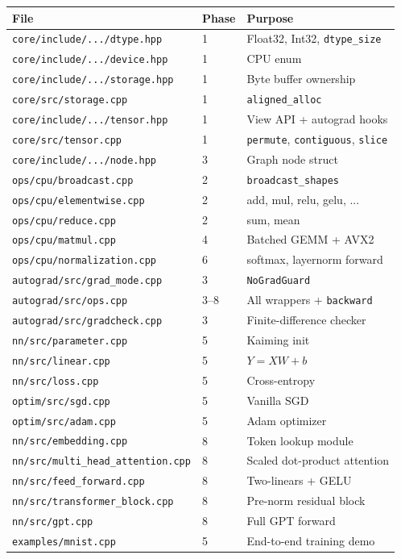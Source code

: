 \documentclass[11pt,a4paper]{article}
\begin{document}
\begin{center}
\scriptsize
\begin{longtable}{@{}p{4.5cm}p{2cm}p{7cm}@{}}
  \toprule
  File & Phase & Purpose \\
  \midrule
  \endhead
  \texttt{core/include/.../dtype.hpp} & 1 & Float32, Int32, \texttt{dtype\_size} \\
  \texttt{core/include/.../device.hpp} & 1 & CPU enum \\
  \texttt{core/include/.../storage.hpp} & 1 & Byte buffer ownership \\
  \texttt{core/src/storage.cpp} & 1 & \texttt{aligned\_alloc} \\
  \texttt{core/include/.../tensor.hpp} & 1 & View API + autograd hooks \\
  \texttt{core/src/tensor.cpp} & 1 & \texttt{permute}, \texttt{contiguous}, \texttt{slice} \\
  \texttt{core/include/.../node.hpp} & 3 & Graph node struct \\
  \texttt{ops/cpu/broadcast.cpp} & 2 & \texttt{broadcast\_shapes} \\
  \texttt{ops/cpu/elementwise.cpp} & 2 & add, mul, relu, gelu, ... \\
  \texttt{ops/cpu/reduce.cpp} & 2 & sum, mean \\
  \texttt{ops/cpu/matmul.cpp} & 4 & Batched GEMM + AVX2 \\
  \texttt{ops/cpu/normalization.cpp} & 6 & softmax, layernorm forward \\
  \texttt{autograd/src/grad\_mode.cpp} & 3 & \texttt{NoGradGuard} \\
  \texttt{autograd/src/ops.cpp} & 3--8 & All wrappers + \texttt{backward} \\
  \texttt{autograd/src/gradcheck.cpp} & 3 & Finite-difference checker \\
  \texttt{nn/src/parameter.cpp} & 5 & Kaiming init \\
  \texttt{nn/src/linear.cpp} & 5 & $Y = XW + b$ \\
  \texttt{nn/src/loss.cpp} & 5 & Cross-entropy \\
  \texttt{optim/src/sgd.cpp} & 5 & Vanilla SGD \\
  \texttt{optim/src/adam.cpp} & 5 & Adam optimizer \\
  \texttt{nn/src/embedding.cpp} & 8 & Token lookup module \\
  \texttt{nn/src/multi\_head\_attention.cpp} & 8 & Scaled dot-product attention \\
  \texttt{nn/src/feed\_forward.cpp} & 8 & Two-linears + GELU \\
  \texttt{nn/src/transformer\_block.cpp} & 8 & Pre-norm residual block \\
  \texttt{nn/src/gpt.cpp} & 8 & Full GPT forward \\
  \texttt{examples/mnist.cpp} & 5 & End-to-end training demo \\
  \bottomrule
\end{longtable}
\end{center}
\end{document}
